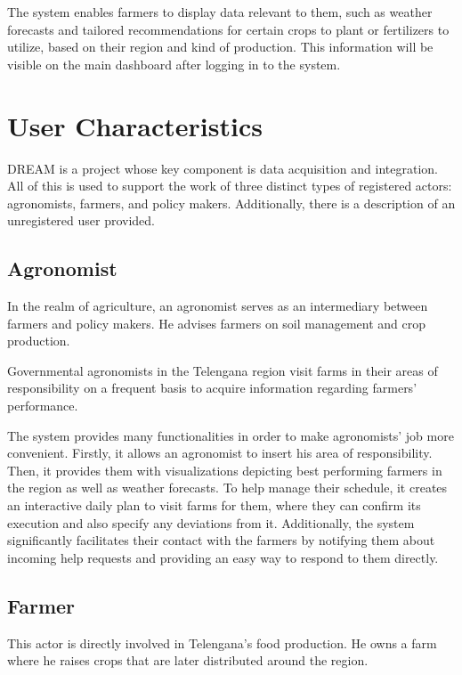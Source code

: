 The system enables farmers to display data relevant to them, such as weather forecasts and tailored recommendations for certain crops to plant or fertilizers to utilize, based on their region and kind of production. This information will be visible on the main dashboard after logging in to the system.

\section{User Characteristics} \label{sec:user_characteristics}

DREAM is a project whose key component is data acquisition and integration. All of this is used to support the work of three distinct types of registered actors: agronomists, farmers, and policy makers. Additionally, there is a description of an unregistered user provided.

\subsection{Agronomist}

In the realm of agriculture, an agronomist serves as an intermediary between farmers and policy makers. He advises farmers on soil management and crop production.

Governmental agronomists in the Telengana region visit farms in their areas of responsibility on a frequent basis to acquire information regarding farmers' performance.

The system provides many functionalities in order to make agronomists' job more convenient. Firstly, it allows an agronomist to insert his area of responsibility. Then, it provides them with visualizations depicting best performing farmers in the region as well as weather forecasts. To help manage their schedule, it creates an interactive daily plan to visit farms for them, where they can confirm its execution and also specify any deviations from it. Additionally, the system significantly facilitates their contact with the farmers by notifying them about incoming help requests and providing an easy way to respond to them directly.

\subsection{Farmer}

This actor is directly involved in Telengana's food production. He owns a farm where he raises crops that are later distributed around the region.


